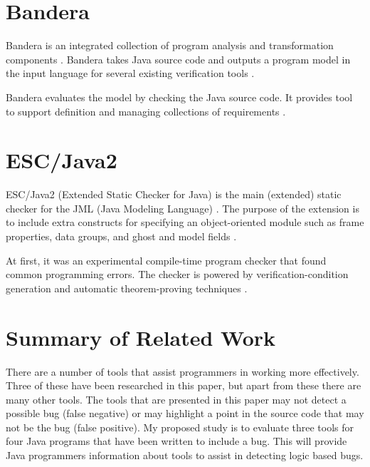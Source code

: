 \section{Bandera}
Bandera is an integrated collection of program analysis and transformation components \cite{Corbett:2000:BEF:337180.337234}. %
Bandera takes Java source code and outputs a program model in the input language for several existing verification tools \cite{Corbett:2000:BEF:337180.337234}.

Bandera evaluates the model by checking the Java source code. It provides tool to support definition and managing collections of requirements \cite{Corbett:2000:BSI:337180.337625}.

\section{ESC/Java2}
ESC/Java2 (Extended Static Checker for Java) is the main (extended) static checker for the JML (Java Modeling Language) \cite{chalin_kiniry_leavens_poll}. The purpose of the extension is to include extra constructs for specifying an object-oriented module such as frame properties, data groups, and ghost and model fields \cite{chalin_kiniry_leavens_poll}.

At first, it was an experimental compile-time program checker that found common programming errors. The checker is powered by verification-condition generation and automatic theorem-proving techniques \cite{Flanagan:2002:ESC:512529.512558} \cite{Flanagan:2002:ESC:543552.512558}.

\section{Summary of Related Work}
There are a number of tools that assist programmers in working more effectively. Three of these have been researched in this paper, but apart from these there are many other tools. The tools that are presented in this paper may not detect a possible bug (false negative) or may highlight a point in the source code that may not be the bug (false positive). My proposed study is to evaluate three tools for four Java programs that have been written to include a bug. This will provide Java programmers information about tools to assist in detecting logic based bugs.



